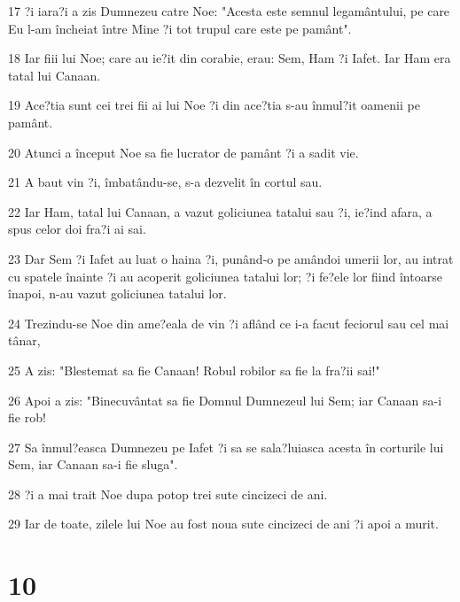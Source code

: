 \par 17 ?i iara?i a zis Dumnezeu catre Noe: "Acesta este semnul legamântului, pe care Eu l-am încheiat între Mine ?i tot trupul care este pe pamânt".
\par 18 Iar fiii lui Noe; care au ie?it din corabie, erau: Sem, Ham ?i Iafet. Iar Ham era tatal lui Canaan.
\par 19 Ace?tia sunt cei trei fii ai lui Noe ?i din ace?tia s-au înmul?it oamenii pe pamânt.
\par 20 Atunci a început Noe sa fie lucrator de pamânt ?i a sadit vie.
\par 21 A baut vin ?i, îmbatându-se, s-a dezvelit în cortul sau.
\par 22 Iar Ham, tatal lui Canaan, a vazut goliciunea tatalui sau ?i, ie?ind afara, a spus celor doi fra?i ai sai.
\par 23 Dar Sem ?i Iafet au luat o haina ?i, punând-o pe amândoi umerii lor, au intrat cu spatele înainte ?i au acoperit goliciunea tatalui lor; ?i fe?ele lor fiind întoarse înapoi, n-au vazut goliciunea tatalui lor.
\par 24 Trezindu-se Noe din ame?eala de vin ?i aflând ce i-a facut feciorul sau cel mai tânar,
\par 25 A zis: "Blestemat sa fie Canaan! Robul robilor sa fie la fra?ii sai!"
\par 26 Apoi a zis: "Binecuvântat sa fie Domnul Dumnezeul lui Sem; iar Canaan sa-i fie rob!
\par 27 Sa înmul?easca Dumnezeu pe Iafet ?i sa se sala?luiasca acesta în corturile lui Sem, iar Canaan sa-i fie sluga".
\par 28 ?i a mai trait Noe dupa potop trei sute cincizeci de ani.
\par 29 Iar de toate, zilele lui Noe au fost noua sute cincizeci de ani ?i apoi a murit.

\chapter{10}

